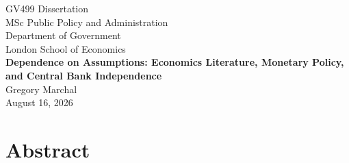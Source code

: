 \documentclass[12pt,a4paper]{article}
\begin{document}

\begin{doublespace}
\thispagestyle{empty}
\begin{center}
    \vspace*{2cm}
    {\large GV499 Dissertation\\
    MSc Public Policy and Administration \\
    Department of Government\\
    London School of Economics}\\
    \vspace{2cm}
    {\Large\textbf{Dependence on Assumptions: Economics Literature, Monetary Policy, and Central Bank Independence}}\\
    \vspace{2cm}
        Gregory Marchal\\
    \vspace{0.5cm}
    August 16, 2026
\end{center}



\newpage



\section*{Abstract}
\vspace{\baselineskip}


\end{doublespace}
\end{document}
